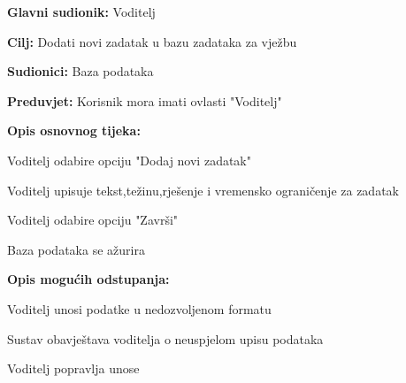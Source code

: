 					\noindent {}
					\begin{packed_item}
	
						\item \textbf{Glavni sudionik: } Voditelj
						\item  \textbf{Cilj:} Dodati novi zadatak u bazu zadataka za vježbu
						\item  \textbf{Sudionici:} Baza podataka
						\item  \textbf{Preduvjet:} Korisnik mora imati ovlasti "Voditelj"
						\item  \textbf{Opis osnovnog tijeka:}
						
						\item[] \begin{packed_enum}
	
							\item Voditelj odabire opciju "Dodaj novi zadatak"
							\item Voditelj upisuje tekst,težinu,rješenje i vremensko ograničenje za zadatak
							\item Voditelj odabire opciju "Završi"
							\item Baza podataka se ažurira
						\end{packed_enum}

						\item  \textbf{Opis mogućih odstupanja:}
						
						\item[] \begin{packed_item}
	
							\item[2.a] Voditelj unosi podatke u nedozvoljenom formatu
							\item[] \begin{packed_enum}
								
								\item Sustav obavještava voditelja o neuspjelom upisu podataka
								\item Voditelj popravlja unose
								
							\end{packed_enum}
						\end{packed_item}
						
						
					\end{packed_item}

